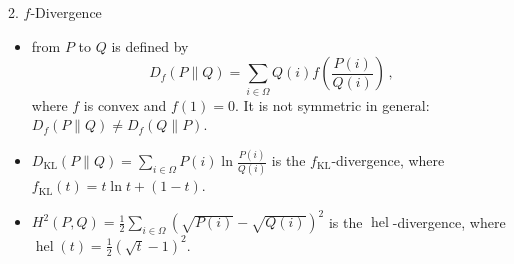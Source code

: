 \documentclass[final]{beamer}
\DeclareMathOperator{\hel}{hel}
\newcommand{\kl}[2]{D_{\mathrm{KL}}( #1 \parallel #2 )}
\newlength{\onecolwid}
\begin{document}
\begin{frame}[t]
\begin{columns}[t]
\begin{column}{\onecolwid}
		
	\begin{block}{2. $ f $-Divergence}
\begin{itemize}	
		\item	{}  from $ P $ 
		to $ Q $
			is defined by
			\begin{equation}\label{eq:definition_f_divergence}
			D_f(P\parallel Q) = \sum_{i\in \Omega} Q(i) f\left( 
			\frac{P(i)}{Q(i)} 
			\right) \,,
			\end{equation}
			where $ f $ is convex and $ f(1)=0 $.
			It is not symmetric in general: $ D_f(P\parallel 
			Q)\ne 
			D_f(Q\parallel P) $.
			
			\item {} $ \kl{P}{Q}= \sum_{i\in 
			\Omega} P(i) \ln\frac{P(i)}{Q(i)}  $ is the $ 
			f_{\mathrm{KL}} 
			$-divergence,
			where
			 $ f_{\mathrm{KL}}(t) = t\ln t + (1-t) $.
			
		\item	{}
	 $ H^2(P,Q) = 
		\frac{1}{2} \sum_{i\in \Omega} 
		(\sqrt{P(i)}-\sqrt{Q(i)})^2 $ is 
		the $ \hel 
		$-divergence, where
			 $ \hel(t)=\frac{1}{2}(\sqrt{t}-1)^2 $.

			

\end{itemize}
\end{block}
\end{column}
\end{columns}
\end{frame}
\end{document}
